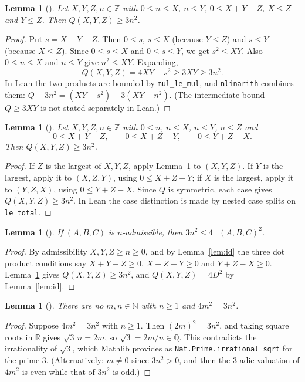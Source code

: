 \documentclass[11pt]{amsart}
\theoremstyle{plain}
\newtheorem{lemma}[theorem]{Lemma}
\theoremstyle{definition}
\newcommand{\N}{\mathbb{N}}
\newcommand{\Z}{\mathbb{Z}}
\newcommand{\R}{\mathbb{R}}
\DeclareMathOperator{\dett}{det_2}
\begin{document}
\begin{lemma}[]\label{lem:max}
Let $X,Y,Z,n\in\Z$ with $0\le n\le X$, $n\le Y$, $0\le X+Y-Z$, $X\le Z$ and $Y\le Z$. Then $Q(X,Y,Z)\ge3n^2$.
\end{lemma}

\begin{proof}
Put $s=X+Y-Z$. Then $0\le s$, $s\le X$ (because $Y\le Z$) and $s\le Y$ (because $X\le Z$). Since $0\le s\le X$ and $0\le s\le Y$, we get $s^2\le XY$. Also $0\le n\le X$ and $n\le Y$ give $n^2\le XY$. Expanding,
\[
  Q(X,Y,Z)=4XY-s^2\ge 3XY\ge 3n^2 .
\]
In Lean the two products are bounded by \texttt{mul\_le\_mul}, and \texttt{nlinarith} combines them: $Q-3n^2=(XY-s^2)+3(XY-n^2)$. (The intermediate bound $Q\ge3XY$ is not stated separately in Lean.)
\end{proof}

\begin{lemma}[]\label{lem:sym}
Let $X,Y,Z,n\in\Z$ with $0\le n$, $n\le X$, $n\le Y$, $n\le Z$ and
\[
  0\le X+Y-Z,\qquad 0\le X+Z-Y,\qquad 0\le Y+Z-X .
\]
Then $Q(X,Y,Z)\ge3n^2$.
\end{lemma}

\begin{proof}
If $Z$ is the largest of $X,Y,Z$, apply Lemma~\ref{lem:max} to $(X,Y,Z)$. If $Y$ is the largest, apply it to $(X,Z,Y)$, using $0\le X+Z-Y$; if $X$ is the largest, apply it to $(Y,Z,X)$, using $0\le Y+Z-X$. Since $Q$ is symmetric, each case gives $Q(X,Y,Z)\ge3n^2$. In Lean the case distinction is made by nested case splits on \texttt{le\_total}.
\end{proof}

\begin{lemma}[]\label{lem:det}
If $(A,B,C)$ is $n$-admissible, then $3n^2\le4\,\dett(A,B,C)^2$.
\end{lemma}

\begin{proof}
By admissibility $X,Y,Z\ge n\ge0$, and by Lemma~\ref{lem:id} the three dot product conditions say $X+Y-Z\ge0$, $X+Z-Y\ge0$ and $Y+Z-X\ge0$. Lemma~\ref{lem:sym} gives $Q(X,Y,Z)\ge3n^2$, and $Q(X,Y,Z)=4D^2$ by Lemma~\ref{lem:id}.
\end{proof}

\begin{lemma}[]\label{lem:irr}
There are no $m,n\in\N$ with $n\ge1$ and $4m^2=3n^2$.
\end{lemma}

\begin{proof}
Suppose $4m^2=3n^2$ with $n\ge1$. Then $(2m)^2=3n^2$, and taking square roots in $\R$ gives $\sqrt3\,n=2m$, so $\sqrt3=2m/n\in\mathbb{Q}$. This contradicts the irrationality of $\sqrt3$, which Mathlib provides as \texttt{Nat.Prime.irrational\_sqrt} for the prime $3$.
(Alternatively: $m\ne0$ since $3n^2>0$, and then the $3$-adic valuation of $4m^2$ is even while that of $3n^2$ is odd.)
\end{proof}
\end{document}
